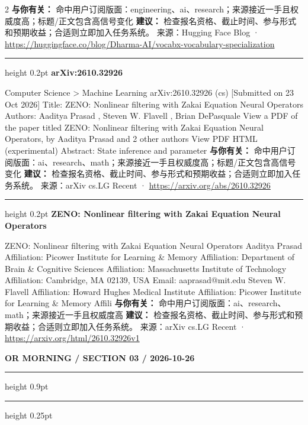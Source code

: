 \documentclass[10.5pt]{ctexart}
\begin{document}
\begin{multicols}{2}
\textbf{与你有关：} 命中用户订阅版面：engineering、ai、research；来源接近一手且权威度高；标题/正文包含高信号变化
\textbf{建议：} 检查报名资格、截止时间、参与形式和预期收益；合适则立即加入任务系统。
{\footnotesize\color{ormuted} 来源：Hugging Face Blog · \url{https://huggingface.co/blog/Dharma-AI/vocabx-vocabulary-specialization}}
\vspace{2mm}
\hrule height 0.2pt
\vspace{2mm}
{\large\bfseries arXiv:2610.32926}\par
Computer Science > Machine Learning arXiv:2610.32926 (cs) [Submitted on 23 Oct 2026] Title: ZENO: Nonlinear filtering with Zakai Equation Neural Operators Authors: Aaditya Prasad , Steven W. Flavell , Brian DePasquale View a PDF of the paper titled ZENO: Nonlinear filtering with Zakai Equation Neural Operators, by Aaditya Prasad and 2 other authors View PDF HTML (experimental) Abstract: State inference and parameter 
\textbf{与你有关：} 命中用户订阅版面：ai、research、math；来源接近一手且权威度高；标题/正文包含高信号变化
\textbf{建议：} 检查报名资格、截止时间、参与形式和预期收益；合适则立即加入任务系统。
{\footnotesize\color{ormuted} 来源：arXiv cs.LG Recent · \url{https://arxiv.org/abs/2610.32926}}
\vspace{2mm}
\hrule height 0.2pt
\vspace{2mm}
{\large\bfseries ZENO: Nonlinear filtering with Zakai Equation Neural Operators}\par
ZENO: Nonlinear filtering with Zakai Equation Neural Operators Aaditya Prasad Affiliation: Picower Institute for Learning \& Memory Affiliation: Department of Brain \& Cognitive Sciences Affiliation: Massachusetts Institute of Technology Affiliation: Cambridge, MA 02139, USA Email: aaprasad@mit.edu Steven W. Flavell Affiliation: Howard Hughes Medical Institute Affiliation: Picower Institute for Learning \& Memory Affili
\textbf{与你有关：} 命中用户订阅版面：ai、research、math；来源接近一手且权威度高
\textbf{建议：} 检查报名资格、截止时间、参与形式和预期收益；合适则立即加入任务系统。
{\footnotesize\color{ormuted} 来源：arXiv cs.LG Recent · \url{https://arxiv.org/html/2610.32926v1}}
\end{multicols}
\newpage
{\small\bfseries OR MORNING / SECTION 03 / 2026-10-26}
\vspace{2mm}
\hrule height 0.9pt
\vspace{1.5mm}
\hrule height 0.25pt
\vspace{4mm}
\end{document}
